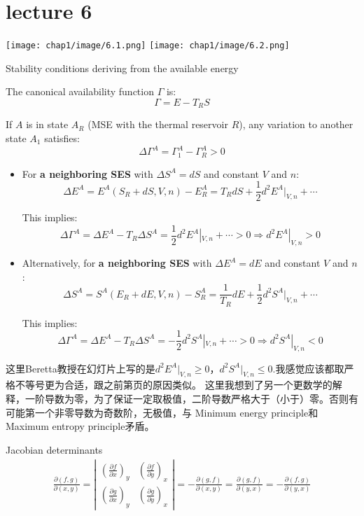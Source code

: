 \section{lecture 6}
\begin{minipage}{0.9\linewidth}
        \centering
        \texttt{[image: chap1/image/6.1.png]}
        \texttt{[image: chap1/image/6.2.png]}
\end{minipage}
\begin{thm}
    Stability conditions deriving from the available energy 

The canonical availability function \( \Gamma \) is:
\[
\Gamma = E - T_R S
\]

If \( A \) is in state \( A_R \) (MSE with the thermal reservoir \( R \)), any variation to another state \( A_1 \) satisfies:
\[
\Delta \Gamma^A = \Gamma_1^A - \Gamma_R^A > 0
\]
\begin{itemize}
    \item For \textbf{a neighboring SES} with \( \Delta S^A = dS \) and constant \( V \) and \( n \):
\[
\Delta E^A = E^A(S_R + dS, V, n) - E_R^A = T_R dS + \frac{1}{2}d^2E^A|_{V,n} + \cdots
\]

This implies:
\[
\Delta \Gamma^A = \Delta E^A - T_R \Delta S^A = \frac{1}{2}d^2E^A|_{V,n} + \cdots > 0 \Rightarrow d^2E^A|_{V,n} > 0
\]

\item Alternatively, for \textbf{a neighboring SES} with \( \Delta E^A = dE \) and constant \( V \) and \( n \):
\[
\Delta S^A = S^A(E_R + dE, V, n) - S_R^A = \frac{1}{T_R}dE + \frac{1}{2}d^2S^A|_{V,n} + \cdots
\]

This implies:
\[
\Delta \Gamma^A = \Delta E^A - T_R \Delta S^A = -\frac{1}{2}d^2S^A|_{V,n} + \cdots > 0 \Rightarrow d^2S^A|_{V,n} < 0
\]
\end{itemize}
\begin{zhu}
    这里Beretta教授在幻灯片上写的是\(d^2E^A|_{V,n} \geq 0\)，\(d^2S^A|_{V,n} \leq 0\).我感觉应该都取严格不等号更为合适，跟之前第\pageref{<>}页的原因类似。
    这里我想到了另一个更数学的解释，一阶导数为零，为了保证一定取极值，二阶导数严格大于（小于）零。否则有可能第一个非零导数为奇数阶，无极值，与
    Minimum energy principle和Maximum entropy principle矛盾。
\end{zhu}
\end{thm}
\begin{defn}
    Jacobian determinants
\begin{align*}
\frac{\partial (f,g)}{\partial (x,y)} 
= \left| \begin{array}{cc} 
\left( \frac{\partial f}{\partial x} \right)_y & \left( \frac{\partial f}{\partial y} \right)_x \\ 
\left( \frac{\partial g}{\partial x} \right)_y & \left( \frac{\partial g}{\partial y} \right)_x 
\end{array} \right| 
= - \frac{\partial (g,f)}{\partial (x,y)} 
= \frac{\partial (g,f)}{\partial (y,x)} 
= - \frac{\partial (f,g)}{\partial (y,x)}
\end{align*}
\end{defn}

